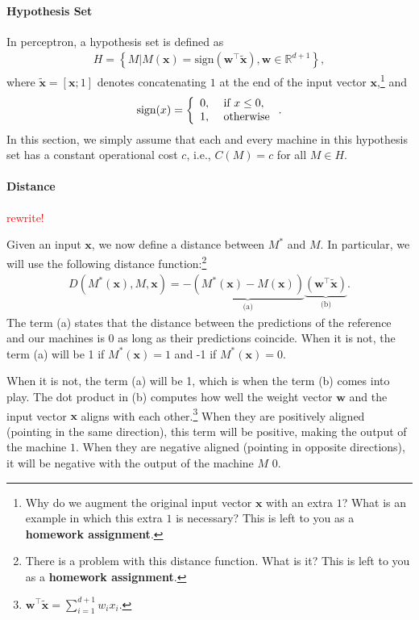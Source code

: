 \documentclass{report}
\newcommand{\vect}[1]{\mathbf{#1}}
\newcommand{\vx}[0]{\vect{x}}
\newcommand{\vw}[0]{\vect{w}}
\newcommand{\sign}{\text{sign}}
\newcommand{\todo}[1]{{\Large\textcolor{red}{#1}}}
\begin{document}
\paragraph{Hypothesis Set}

In perceptron, a hypothesis set is defined as
\begin{align*}
    H = \left\{ 
    M | M(\vx) = \sign(\vw^\top \tilde{\vx}), \vw \in \mathbb{R}^{d+1}
    \right\},
\end{align*}
where $\tilde{\vx} = \left[ \vx; 1\right]$ denotes concatenating $1$ at the end
of the input vector $\vx$,\footnote{
    Why do we augment the original input vector $\vx$ with an extra $1$? What is
    an example in which this extra $1$ is necessary?  This is left to you as a
    {\bf homework assignment}.
}
and 
\begin{align}
    \label{eq:sign}
    \sign(x) = \left\{ \begin{array}{l l}
            0,&\text{ if } x \leq 0, \\
            1,&\text{ otherwise}
        \end{array}
        \right..
\end{align}
In this section, we simply assume that each and every machine in this hypothesis
set has a constant operational cost $c$, i.e., $C(M)=c$ for all $M\in H$. 

\paragraph{Distance}

\todo{rewrite!}

Given an input $\vx$, we now define a distance between $M^*$ and $M$. In
particular, we will use the following distance function:\footnote{
    There is a problem with this distance function. What is it?  This is left to
    you as a {\bf homework assignment}.
}
\begin{align}
    \label{eq:perceptron_dist}
    D(M^*(\vx), M, \vx) = -\underbrace{\left( M^*(\vx) - M(\vx)
    \right)}_{\text{(a)}} \underbrace{\left(\vw^\top
    \tilde{\vx}\right)}_{\text{(b)}}.
\end{align}
The term (a) states that the distance between the predictions of the reference
and our machines is $0$ as long as their predictions coincide. When it is not,
the term (a) will be 1 if $M^*(\vx) = 1$ and -1 if $M^*(\vx) = 0$.

When it is not, the term (a) will be 1, which is when the term (b) comes into
play. The dot product in (b) computes how well the weight vector $\vw$ and the
input vector $\vx$ aligns with each other.\footnote{
    $\vw^\top \tilde{\vx} = \sum_{i=1}^{d+1} w_i x_i$.
} When they are positively aligned (pointing in the same direction), this term
will be positive, making the output of the machine $1$. When they are negative
aligned (pointing in opposite directions), it will be negative with the output
of the machine $M$ $0$.
\end{document}
